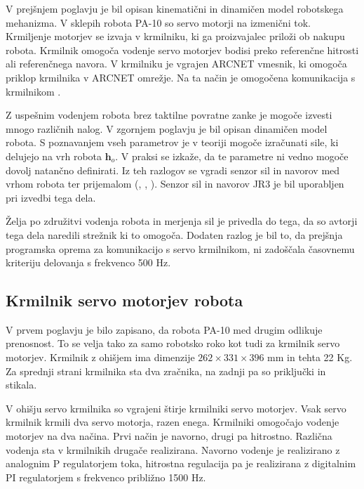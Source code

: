 \documentclass[a4paper]{article}
\begin{document}
V prejšnjem poglavju je bil opisan kinematični in dinamičen model robotskega mehanizma. V sklepih robota PA-10 so servo motorji na izmenični tok. Krmiljenje motorjev se izvaja v krmilniku, ki ga proizvajalec priloži ob nakupu robota. Krmilnik omogoča vodenje servo motorjev bodisi preko referenčne hitrosti ali referenčnega navora. V krmilniku je vgrajen ARCNET vmesnik, ki omogoča priklop krmilnika v ARCNET omrežje. Na ta način je omogočena komunikacija s krmilnikom \cite{pa10-manual}.

Z uspešnim vodenjem robota brez taktilne povratne zanke je mogoče izvesti mnogo različnih nalog. V zgornjem poglavju je bil opisan dinamičen model robota. S poznavanjem vseh parametrov je v teoriji mogoče izračunati sile, ki delujejo na vrh robota $\textbf{h}_o$. V praksi se izkaže, da te parametre ni vedno mogoče dovolj natančno definirati. Iz teh razlogov se vgradi senzor sil in navorov med vrhom robota ter prijemalom (\cite{almassri_pressure_sensor}, \cite{mihelj_vodenje}, \cite{eppinger_force_dynamics}). Senzor sil in navorov JR3 je bil uporabljen pri izvedbi tega dela.

Želja po združitvi vodenja robota in merjenja sil je privedla do tega, da so avtorji tega dela naredili strežnik ki to omogoča. Dodaten razlog je bil to, da prejšnja programska oprema za komunikacijo s servo krmilnikom, ni zadoščala časovnemu kriteriju delovanja s frekvenco 500 Hz.

\subsection{Krmilnik servo motorjev robota} \label{sec:servo-drive}

V prvem poglavju je bilo zapisano, da robota PA-10 med drugim odlikuje prenosnost. To se velja tako za samo robotsko roko kot tudi za krmilnik servo motorjev. Krmilnik z ohišjem ima dimenzije $262 \times 331 \times 396$ mm in tehta 22 Kg. Za sprednji strani krmilnika sta dva zračnika, na zadnji pa so priključki in stikala.

%

V ohišju servo krmilnika so vgrajeni štirje krmilniki servo motorjev. Vsak servo krmilnik krmili dva servo motorja, razen enega. Krmilniki omogočajo vodenje motorjev na dva načina. Prvi način je navorno, drugi pa hitrostno. Različna vodenja sta v krmilnikih drugače realizirana. Navorno vodenje je realizirano z analognim P regulatorjem toka, hitrostna regulacija pa je realizirana z digitalnim PI regulatorjem s frekvenco približno 1500 Hz.
\end{document}
